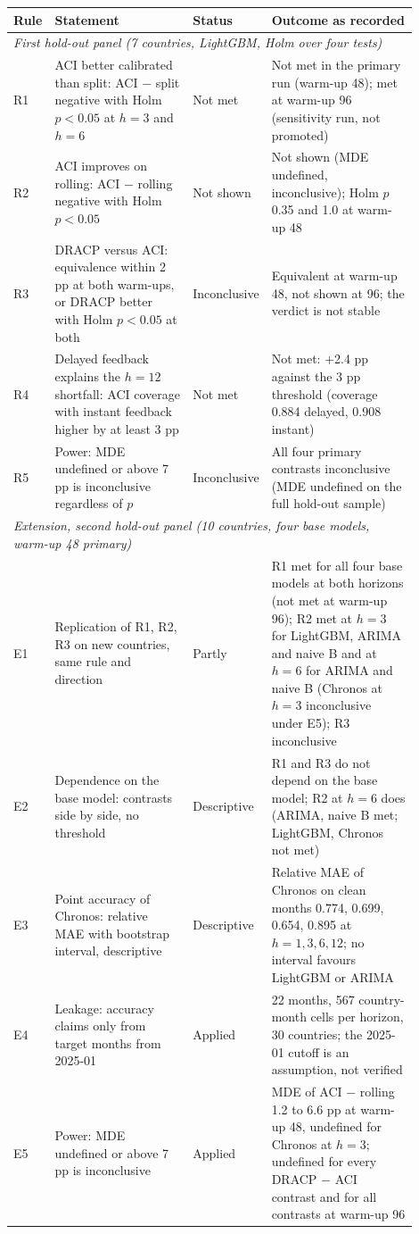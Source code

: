 \begin{tabular}{p{0.05\linewidth}p{0.36\linewidth}p{0.11\linewidth}p{0.38\linewidth}}
\toprule
Rule & Statement & Status & Outcome as recorded \\
\midrule
\multicolumn{4}{l}{\emph{First hold-out panel (7 countries, LightGBM, Holm over four tests)}} \\
R1 & ACI better calibrated than split: ACI $-$ split negative with Holm $p<0.05$ at $h=3$ and $h=6$ & Not met & Not met in the primary run (warm-up 48); met at warm-up 96 (sensitivity run, not promoted) \\
R2 & ACI improves on rolling: ACI $-$ rolling negative with Holm $p<0.05$ & Not shown & Not shown (MDE undefined, inconclusive); Holm $p$ 0.35 and 1.0 at warm-up 48 \\
R3 & DRACP versus ACI: equivalence within 2 pp at both warm-ups, or DRACP better with Holm $p<0.05$ at both & Inconclusive & Equivalent at warm-up 48, not shown at 96; the verdict is not stable \\
R4 & Delayed feedback explains the $h=12$ shortfall: ACI coverage with instant feedback higher by at least 3 pp & Not met & Not met: +2.4 pp against the 3 pp threshold (coverage 0.884 delayed, 0.908 instant) \\
R5 & Power: MDE undefined or above 7 pp is inconclusive regardless of $p$ & Inconclusive & All four primary contrasts inconclusive (MDE undefined on the full hold-out sample) \\
\midrule
\multicolumn{4}{l}{\emph{Extension, second hold-out panel (10 countries, four base models, warm-up 48 primary)}} \\
E1 & Replication of R1, R2, R3 on new countries, same rule and direction & Partly & R1 met for all four base models at both horizons (not met at warm-up 96); R2 met at $h=3$ for LightGBM, ARIMA and naive B and at $h=6$ for ARIMA and naive B (Chronos at $h=3$ inconclusive under E5); R3 inconclusive \\
E2 & Dependence on the base model: contrasts side by side, no threshold & Descriptive & R1 and R3 do not depend on the base model; R2 at $h=6$ does (ARIMA, naive B met; LightGBM, Chronos not met) \\
E3 & Point accuracy of Chronos: relative MAE with bootstrap interval, descriptive & Descriptive & Relative MAE of Chronos on clean months 0.774, 0.699, 0.654, 0.895 at $h=1,3,6,12$; no interval favours LightGBM or ARIMA \\
E4 & Leakage: accuracy claims only from target months from 2025-01 & Applied & 22 months, 567 country-month cells per horizon, 30 countries; the 2025-01 cutoff is an assumption, not verified \\
E5 & Power: MDE undefined or above 7 pp is inconclusive & Applied & MDE of ACI $-$ rolling 1.2 to 6.6 pp at warm-up 48, undefined for Chronos at $h=3$; undefined for every DRACP $-$ ACI contrast and for all contrasts at warm-up 96 \\
\bottomrule
\end{tabular}
